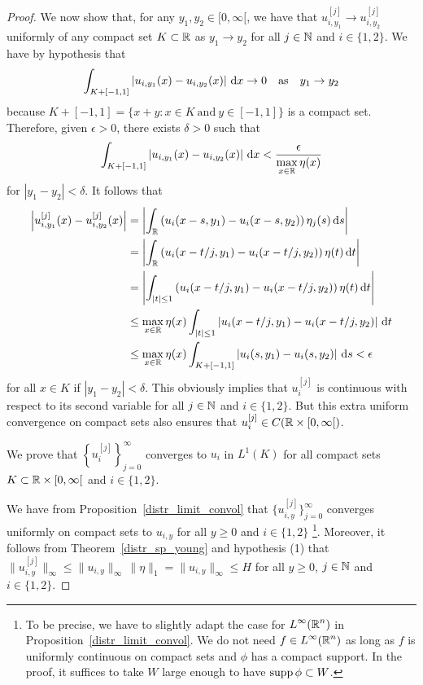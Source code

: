 \begin{proof}
We now show that, for any $y_1,y_2 \in [0,\infty[$,
we have that $\displaystyle u_{i,y_1}^{[j]} \to u_{i,y_2}^{[j]}$
uniformly of any compact set $K \subset \mathbb{R}$ as $y_1 \to y_2$
for all $j \in \mathbb{N}$ and $i\in \{1,2\}$.  We have by hypothesis that
\[
\int_{K+[-1,1]} \left|u_{i,y_1}(x) - u_{i,y_2}(x)\right| \,\mathrm{d}{x} \to 0
\quad \text{as} \quad y_1 \to y_2
\]
because $K+[-1,1] = \{ x + y : x \in K \ \text{and} \ y \in [-1,1]\}$
is a compact set.
Therefore, given $\epsilon >0$, there exists $\delta > 0$ such that
\[
\int_{K+[-1,1]} \left|u_{i,y_1}(x) - u_{i,y_2}(x)\right| \,\mathrm{d}{x} <
\frac{\epsilon}{\displaystyle \max_{x\in\mathbb{R}} \eta(x)} 
\]
for $|y_1-y_2| < \delta$.  It follows that
\begin{align*}
\left| u_{i,y_1}^{[j]}(x) - u_{i,y_2}^{[j]}(x)\right|
&= \left| \int_{\mathbb{R}} \left( u_i(x-s,y_1) - u_i(x-s,y_2)\right)
\eta_j(s) \,\mathrm{d}{s} \right| \\
&= \left| \int_{\mathbb{R}} \left(u_i(x-t/j,y_1) - u_i(x-t/j ,y_2)\right)
\eta(t) \,\mathrm{d}{t} \right| \\
&= \left| \int_{|t|\leq 1} \left(u_i(x-t/j,y_1) - u_i(x-t/j,y_2)\right)
\eta(t) \,\mathrm{d}{t} \right| \\
& \leq \max_{x\in\mathbb{R}}\eta(x)
\int_{|t|\leq 1} \left| u_i(x-t/j,y_1) - u_i(x-t/j ,y_2) \right|
\,\mathrm{d}{t} \\
&\leq \max_{x\in\mathbb{R}}\eta(x)
\int_{K+[-1,1]} \left| u_i(s,y_1) - u_i(s,y_2) \right| \,\mathrm{d}{s}
< \epsilon
\end{align*}
for all $x \in K$ if $|y_1-y_2| < \delta$.  This obviously implies that
$\displaystyle u_i^{[j]}$ is continuous with respect to its second
variable for all $j \in \mathbb{N}$ and $i\in \{1,2\}$.  But this extra
uniform convergence on compact sets also ensures that
$\displaystyle u_i^{[j]} \in C(\mathbb{R} \times [0,\infty[)$.

 We prove that
$\displaystyle \left\{ u_i^{[j]} \right\}_{j=0}^\infty$
converges to $u_i$ in $\displaystyle L^1(K)$ for all compact sets
$\displaystyle K \subset \mathbb{R}\times [0,\infty[$ and
$i\in \{1,2\}$.

We have from Proposition~\ref{distr_limit_convol} that
$\displaystyle \{ u_{i,y}^{[j]} \}_{j=0}^\infty$ converges uniformly
on compact sets to $u_{i,y}$ for all $y \geq 0$ and $i \in \{1,2\}$
\footnote{To be precise, we have to slightly adapt the case for
$\displaystyle L^\infty(\mathbb{R}^n)$ in Proposition~\ref{distr_limit_convol}.
We do not need $\displaystyle f \in L^\infty(\mathbb{R}^n)$ as long as
$f$ is uniformly continuous on compact sets and $\phi$ has a compact
support.  In the proof, it suffices to take $W$ large enough to have
$\operatorname{supp} \phi \subset W$.}.
Moreover, it follows from Theorem~\ref{distr_sp_young} and hypothesis
(1) that
$\displaystyle \|u_{i,y}^{[j]} \|_\infty \leq \|u_{i,y}\|_\infty \, \|\eta\|_1
= \|u_{i,y}\|_{\infty} \leq H$ for all $y\geq 0$, $j\in \mathbb{N}$ and
$i \in \{1,2\}$.


\end{proof}

